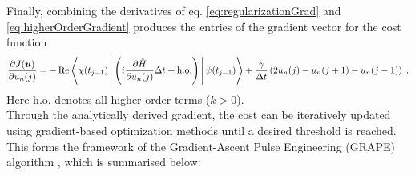 Finally, combining the derivatives of eq. \eqref{eq:regularizationGrad} and \eqref{eq:higherOrderGradient} produces the entries of the gradient vector for the cost function
\begin{equation}
	\frac{\partial J (\boldsymbol{u})}{\partial u_n (j)}  = - \Re \Braket{\chi (t_{j-1}) | \left( i \frac{\partial \hat{H}}{\partial u_n (j)} \Delta t + \mathrm{h.o.} \right)  | \psi (t_{j-1})}  + \frac{\gamma}{\Delta t} \left( 2 u_n (j) - u_n (j+1) - u_n (j-1) \right) \; .
	\label{eq:costGradient}
\end{equation}
Here $\mathrm{h.o.}$ denotes all higher order terms ($k > 0$).\\ 

Through the analytically derived gradient, the cost can be iteratively updated using gradient-based optimization methods until a desired threshold is reached. This forms the framework of the Gradient-Ascent Pulse Engineering (GRAPE) algorithm \cite{Khaneja2005}, which is summarised below:

